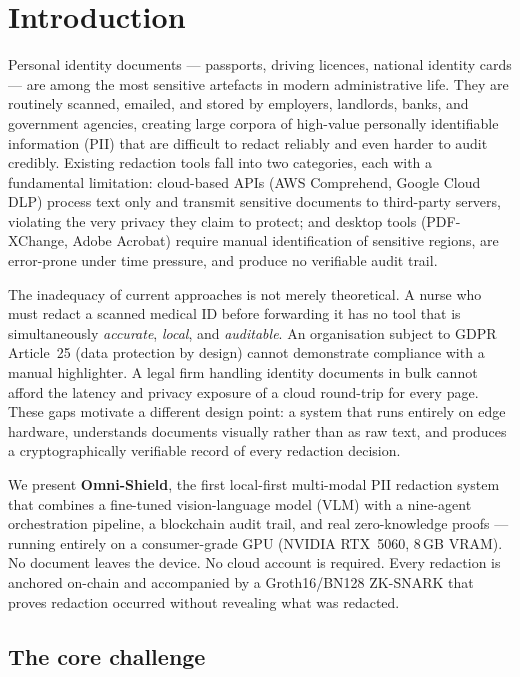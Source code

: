 \section{Introduction}
\label{sec:introduction}

Personal identity documents --- passports, driving licences,
national identity cards --- are among the most sensitive
artefacts in modern administrative life.
They are routinely scanned, emailed, and stored by employers,
landlords, banks, and government agencies, creating large
corpora of high-value personally identifiable information
(PII) that are difficult to redact reliably and even
harder to audit credibly.
Existing redaction tools fall into two categories, each
with a fundamental limitation: cloud-based APIs (AWS
Comprehend, Google Cloud DLP) process text only and
transmit sensitive documents to third-party servers,
violating the very privacy they claim to protect;
and desktop tools (PDF-XChange, Adobe Acrobat) require
manual identification of sensitive regions, are error-prone
under time pressure, and produce no verifiable audit trail.

The inadequacy of current approaches is not merely
theoretical.
A nurse who must redact a scanned medical ID before
forwarding it has no tool that is simultaneously
\emph{accurate}, \emph{local}, and \emph{auditable}.
An organisation subject to GDPR Article~25 (data protection
by design) cannot demonstrate compliance with a manual
highlighter.
A legal firm handling identity documents in bulk cannot
afford the latency and privacy exposure of a cloud
round-trip for every page.
These gaps motivate a different design point: a system that
runs entirely on edge hardware, understands documents
visually rather than as raw text, and produces a
cryptographically verifiable record of every redaction
decision.

We present \textbf{Omni-Shield}, the first local-first
multi-modal PII redaction system that combines a
fine-tuned vision-language model (VLM) with a nine-agent
orchestration pipeline, a blockchain audit trail,
and real zero-knowledge proofs --- running entirely on
a consumer-grade GPU (NVIDIA RTX~5060, 8\,GB VRAM).
No document leaves the device.
No cloud account is required.
Every redaction is anchored on-chain and accompanied by
a Groth16/BN128 ZK-SNARK that proves redaction occurred
without revealing what was redacted.

\subsection*{The core challenge}

